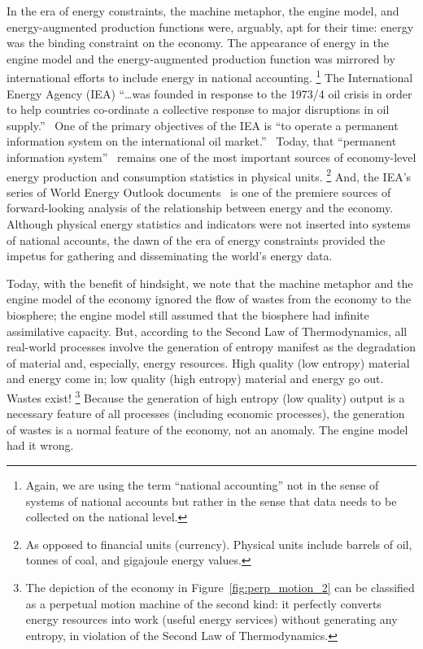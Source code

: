 In the era of energy constraints, 
the machine metaphor, 
the engine model, 
and energy-augmented production functions 
were, arguably, apt for their time:
energy was the binding constraint on the economy.
The appearance of energy in the engine model and
the energy-augmented production function
was mirrored by international efforts 
to include energy in national accounting.%
	\footnote{
	Again, we are using the term ``national accounting''
	not in the sense of systems of national accounts 
	but rather in the sense that data needs to be collected
	on the national level.
	}
The International Energy Agency (IEA) 
``\dots was founded in response to the 1973/4 oil crisis 
in order to help countries co-ordinate a collective response 
to major disruptions in oil supply.''~\cite{International-Energy-Agency:2014aa}
One of the primary objectives of the IEA is 
``to operate a permanent information system 
on the international oil market.''~\cite{International-Energy-Agency:2014aa}
Today, that ``permanent information system''~\cite{International-Energy-Agency:2014ab}
remains one of the most important 
sources of economy-level energy production and consumption
statistics in physical units.%
	\footnote{
	As opposed to financial units (currency).
	Physical units include barrels of oil, tonnes of coal, and gigajoule energy values.
	}
And, the IEA's series of World Energy Outlook 
documents~\cite{International-Energy-Agency:2014ac} is 
one of the premiere sources
of forward-looking analysis of the relationship between energy and the economy.
Although physical energy statistics and indicators
were not inserted into systems of national accounts,
the dawn of the era of energy constraints provided the impetus 
for gathering and disseminating the world's energy data.

Today, with the benefit of hindsight, 
we note that the machine metaphor and the engine model of the economy
ignored the flow of wastes from the economy to the biosphere;
the engine model still assumed that the biosphere had infinite assimilative capacity.
But, according to the Second Law of Thermodynamics, 
all real-world processes involve 
the generation of entropy
manifest as the degradation 
of material and, especially, energy resources.
High quality (low entropy) material and energy come in; 
low quality (high entropy) material and energy go out. 
Wastes exist!%
	\footnote{
	The depiction of the economy in Figure~\ref{fig:perp_motion_2} 
	can be classified as a perpetual motion machine of the second kind: 
	it perfectly converts energy resources into work (useful energy services) 
	without generating any entropy, 
	in violation of the Second Law of Thermodynamics. 	
	}
Because the generation of high entropy (low quality) output 
is a necessary feature of all processes (including economic processes), 
the generation of wastes is a normal feature of the economy, 
not an anomaly. 
The engine model had it wrong.

